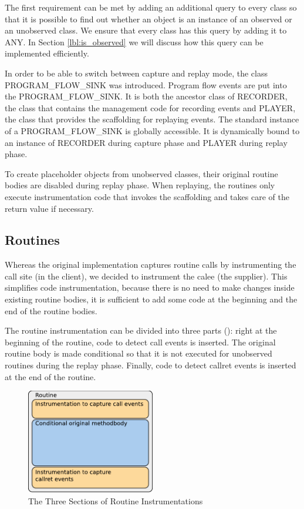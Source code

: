 The first requirement can be met by adding an additional query to every class so that it is possible to find out whether an object is an instance of an observed or an unobserved class. We ensure that every class has this query by adding it to ANY. In Section \ref{lbl:is_observed} we will discuss how this query can be implemented efficiently.

In order to be able to switch between capture and replay mode, the class PROGRAM\hspace{0pt}\_FLOW\hspace{0pt}\_SINK was introduced. Program flow events are put into the PROGRAM\hspace{0pt}\_FLOW\_SINK. It is both the ancestor class of RECORDER, the class that contains the management code for recording events and PLAYER, the class that provides the scaffolding for replaying events. The standard instance of a PROGRAM\hspace{0pt}\_FLOW\_SINK is globally accessible. It is dynamically bound to an instance of RECORDER during capture phase and PLAYER during replay phase.

To create placeholder objects from unobserved classes, their original routine bodies are disabled during replay phase. When replaying, the routines only execute instrumentation code that invokes the scaffolding and takes care of the return value if necessary.

\subsection{Routines}
Whereas the original implementation captures routine calls by instrumenting the call site (in the client), we decided to instrument the calee (the supplier). This simplifies code instrumentation, because there is no need to make changes inside existing routine bodies, it is sufficient to add some code at the beginning and the end of the routine bodies. %

The routine instrumentation can be divided into three parts (): right at the beginning of the routine, code to detect call events is inserted. The original routine body is made conditional so that it is not executed for unobserved routines during the replay phase. Finally, code to detect callret events is inserted at the end of the routine.
\begin{figure}[ht]
  \centering
  \includegraphics[width=0.5\textwidth]{illustrations/routine_instrumentation_structure}
  \caption{The Three Sections of Routine Instrumentations}
  \label{fig:routine_instrumentation_structure}
\end{figure}

